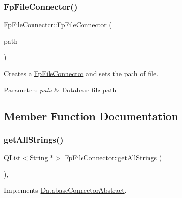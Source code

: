 \subsubsection{\texorpdfstring{Fp\+File\+Connector()}{FpFileConnector()}}
{\footnotesize\ttfamily Fp\+File\+Connector\+::\+Fp\+File\+Connector (\begin{DoxyParamCaption}\item[{const Q\+String \&}]{path }\end{DoxyParamCaption})}



Creates a \mbox{\hyperlink{classFpFileConnector}{Fp\+File\+Connector}} and sets the path of file. 


\begin{DoxyParams}{Parameters}
{\em path} & Database file path \\
\hline
\end{DoxyParams}


\subsection{Member Function Documentation}
\mbox{\label{classFpFileConnector_ad392db922a5e04a670b84fc616192eea}} 
\subsubsection{\texorpdfstring{get\+All\+Strings()}{getAllStrings()}}
{\footnotesize\ttfamily Q\+List$<$\mbox{\hyperlink{classString}{String}} $\ast$$>$ Fp\+File\+Connector\+::get\+All\+Strings (\begin{DoxyParamCaption}{ }\end{DoxyParamCaption})\hspace{0.3cm}{\ttfamily [override]}, {\ttfamily [virtual]}}







Implements \mbox{\hyperlink{classDatabaseConnectorAbstract_aeb4347bc18b6bed9a9b6120f68c10e9d}{Database\+Connector\+Abstract}}.

\mbox{\label{classFpFileConnector_a290016844ec3093b1c58db33fc86cd0a}} 
